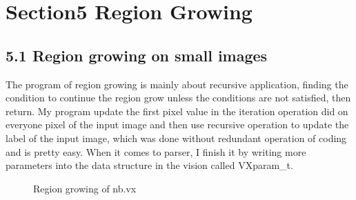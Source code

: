 \documentclass{article}
\begin{document}
\newpage
\section*{Section5 Region Growing}
\subsection*{5.1 Region growing on small images}
The program of region growing is mainly about recursive application, finding the condition to continue the region grow unless the conditions are not satisfied, then return. My program update the first pixel value in the iteration operation did on everyone pixel of the input image and then use recursive operation to update the label of the input image, which was done without redundant operation of coding and is pretty easy. When it comes to parser, I finish it by writing more parameters into the data structure in the vision called VXparam\_t.

\begin{figure}[h]
\centering
{}%
%

%
%
\centering
\caption{ Region growing of nb.vx}
\end{figure}
\end{document}
